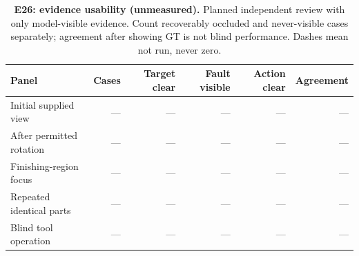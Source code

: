 \begin{table}[!ht]
\centering\small
\caption{\textbf{E26: evidence usability (unmeasured).} Planned independent review with only model-visible evidence. Count recoverably occluded and never-visible cases separately; agreement after showing GT is not blind performance. Dashes mean not run, never zero.}
\begin{tabularx}{\textwidth}{@{}Xrrrrr@{}}\toprule
Panel & Cases & Target clear & Fault visible & Action clear & Agreement\\\midrule
Initial supplied view & --- & --- & --- & --- & ---\\
After permitted rotation & --- & --- & --- & --- & ---\\
Finishing-region focus & --- & --- & --- & --- & ---\\
Repeated identical parts & --- & --- & --- & --- & ---\\
Blind tool operation & --- & --- & --- & --- & ---\\
\bottomrule
\end{tabularx}
\end{table}

